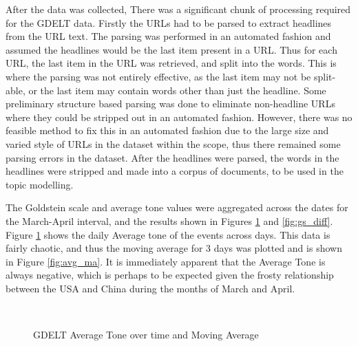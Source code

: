 After the data was collected, There was a significant chunk of processing required for the GDELT data. Firstly the URLs had to be parsed to extract headlines from the URL text. The parsing was performed in an automated fashion and assumed the headlines would be the last item present in a URL. Thus for each URL, the last item in the URL was retrieved, and split into the words. This is where the parsing was not entirely effective, as the last item may not be split-able, or the last item may contain words other than just the headline. Some preliminary structure based parsing was done to eliminate non-headline URLs where they could be stripped out in an automated fashion. However, there was no feasible method to fix this in an automated fashion due to the large size and varied style of URLs in the dataset within the scope, thus there remained some parsing errors in the dataset. After the headlines were parsed, the words in the headlines were stripped and made into a corpus of documents, to be used in the topic modelling. 

The Goldstein scale and average tone values were aggregated across the dates for the March-April interval, and the results shown in Figures \ref{fig:avg_tone_diff} and \ref{fig:gs_diff}. Figure \ref{fig:avg_tone_diff} shows the daily Average tone of the events across days. This data is fairly chaotic, and thus the moving average for 3 days was plotted and is shown in Figure \ref{fig:avg_ma}. It is immediately apparent that the Average Tone is always negative, which is perhaps to be expected given the frosty relationship between the USA and China during the months of March and April. 
 
 \begin{figure}[H]
 	\centering
 	\\
 	\caption{GDELT Average Tone over time and Moving Average}
 	\label{fig:avg_tone_diff}
 \end{figure}
 
